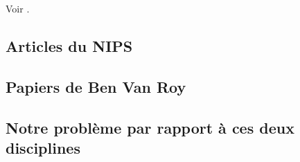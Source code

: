 Voir \cite{cover1991universal,hazan2015online}.

\subsection{Articles du NIPS}

\subsection{Papiers de Ben Van Roy}

\subsection{Notre problème par rapport à ces deux disciplines}









